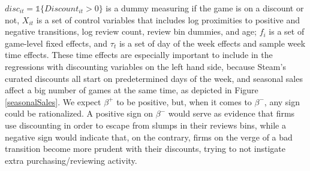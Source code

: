 \documentclass[
  12pt,
  pagebackref]{article}
\begin{document}
\noindent \(disc_{it} = \mathds{1}\{Discount_{it} > 0\}\) is a dummy
measuring if the game is on a discount or not, \(X_{it}\) is a set of
control variables that includes log proximities to positive and negative
transitions, log review count, review bin dummies, and age; \(f_i\) is a
set of game-level fixed effects, and \(\tau_t\) is a set of day of the
week effects and sample week time effects. These time effects are
especially important to include in the regressions with discounting
variables on the left hand side, because Steam's curated discounts all
start on predetermined days of the week, and seasonal sales affect a big
number of games at the same time, as depicted in Figure
\ref{seasonalSales}. We expect \(\beta^+\) to be positive, but, when it
comes to \(\beta^-\), any sign could be rationalized. A positive sign on
\(\beta^-\) would serve as evidence that firms use discounting in order
to escape from slumps in their reviews bins, while a negative sign would
indicate that, on the contrary, firms on the verge of a bad transition
become more prudent with their discounts, trying to not instigate extra
purchasing/reviewing activity.
\end{document}

